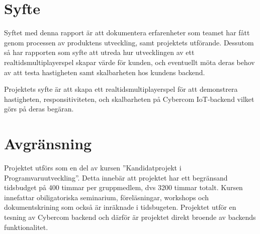 \section{Syfte}
\label{sec:aim}
Syftet med denna rapport är att dokumentera erfarenheter som teamet har fått genom processen av produktens utveckling, samt projektets utförande. Dessutom så 
 har rapporten som syfte att utreda hur utvecklingen av ett realtidsmultiplayerspel  skapar värde för kunden, och eventuellt möta deras behov av att testa hastigheten samt skalbarheten hos kundens backend.


Projektets syfte är att skapa ett realtidsmultiplayerspel för att demonstrera hastigheten, responsitiviteten, och skalbarheten på Cybercom IoT-backend vilket görs på deras begäran. 
\section{Avgränsning}
\label{sec:delimitations}

Projektet utförs som en del av kursen ''Kandidatprojekt i Programvaruutveckling''. Detta innebär att projektet har ett begränsand tidsbudget på 400 timmar
per gruppmedlem, dvs 3200 timmar totalt. Kursen innefattar obiligatoriska seminarium, föreläsningar, workshops och dokumentskrining som också är inräknade i tidsbugeten. 
Projektet utför en tesning av Cybercom backend och därför är projektet direkt broende av backends funktionalitet.  
